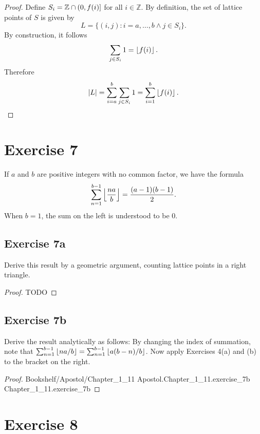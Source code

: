 \documentclass{article}
\newcommand{\link}[1]{\lean{../..}
  {Bookshelf/Apostol/Chapter\_1\_11}
  {Apostol.Chapter\_1\_11.#1}
  {Chapter\_1\_11.#1}
}
\begin{document}
\begin{proof}

  Define $S_i = \mathbb{Z} \cap \left(0, f(i)\right]$ for all $i \in \mathbb{Z}$.
  By definition, the set of lattice points of $S$ is given by
    $$L = \{ (i, j) : i = a, \ldots, b \land j \in S_i \}.$$
  By construction, it follows $$\sum_{j \in S_i} 1 = \left\lfloor f(i)\right\rfloor.$$
  Therefore $$\left|L\right|
    = \sum_{i=a}^b \sum_{j \in S_i} 1
    = \sum_{i=1}^b \left\lfloor f(i)\right\rfloor.$$

\end{proof}

\section{Exercise 7}%
\label{sec:exercise-7}

If $a$ and $b$ are positive integers with no common factor, we have the formula
  $$\sum_{n=1}^{b-1} \left\lfloor\frac{na}{b}\right\rfloor = \frac{(a - 1)(b - 1)}{2}.$$
When $b = 1$, the sum on the left is understood to be $0$.

\subsection{Exercise 7a}%
\label{sub:exercise-7a}

Derive this result by a geometric argument, counting lattice points in a right
  triangle.

\begin{proof}

  TODO

\end{proof}

\subsection{Exercise 7b}%
\label{sub:exercise-7b}

Derive the result analytically as follows:
By changing the index of summation, note that
  $\sum_{n=1}^{b-1} \left\lfloor na / b\right\rfloor = \sum_{n=1}^{b-1} \left\lfloor a(b - n) / b\right\rfloor$.
Now apply Exercises 4(a) and (b) to the bracket on the right.

\begin{proof}

  \link{exercise\_7b}

\end{proof}

\section{Exercise 8}%
\label{sec:exercise-8}
\end{document}
